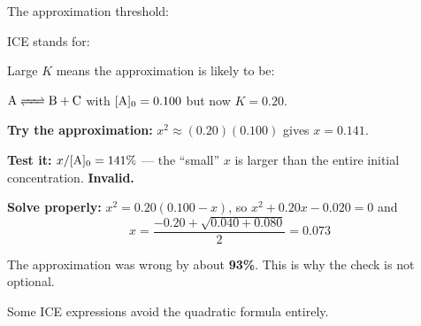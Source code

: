 \documentclass{apchem-notes}
\begin{document}

\begin{warmup}[3]
  \item The approximation threshold: 
  \item ICE stands for: 
  \item Large $K$ means the approximation is likely to be:
\end{warmup}



\begin{workedexample}
$\ce{A <=> B + C}$ with $[\ce{A}]_0 = 0.100$ but now $K = 0.20$.

\textbf{Try the approximation:}
$x^2 \approx (0.20)(0.100)$ gives $x = 0.141$.

\textbf{Test it:} $x/[\ce{A}]_0 = 141\%$ --- the ``small'' $x$ is larger
than the entire initial concentration. \textbf{Invalid.}

\textbf{Solve properly:} $x^2 = 0.20(0.100 - x)$, so
$x^2 + 0.20x - 0.020 = 0$ and
\[ x = \frac{-0.20 + \sqrt{0.040 + 0.080}}{2} = \mathbf{0.073} \]

The approximation was wrong by about \textbf{93\%}. This is why the check
is not optional.
\end{workedexample}



Some ICE expressions avoid the quadratic formula entirely.
\end{document}
